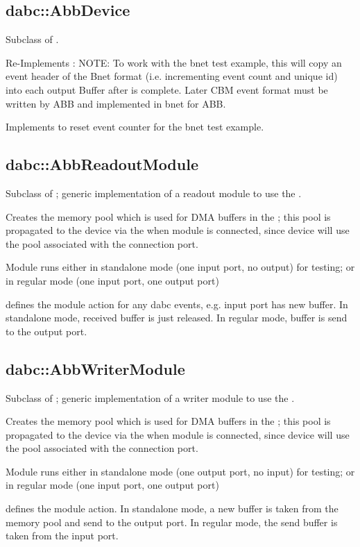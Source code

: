 \subsection{dabc::AbbDevice}
Subclass of .
\bcir
\item Re-Implements : NOTE: To work with the bnet test example, this will copy an event header of the Bnet format (i.e. incrementing event count and unique id) into each output Buffer after  is complete. Later CBM event format must be written by ABB and implemented in bnet for ABB.
\item Implements  to reset event counter for the bnet test example.
\ecir
\subsection{dabc::AbbReadoutModule}
Subclass of ; generic implementation of a readout module to use the .
\bcir
\item Creates the memory pool which is used for DMA buffers in the ; this pool is propagated to the device via the  when module is connected, since device will use the pool associated with the connection port.
\item Module runs either in standalone mode (one input port, no output) for testing; or in regular mode (one input port, one output port)
\item {} defines the module action for any dabc events, e.g. input port has new buffer. In standalone mode, received buffer is just released. In regular mode, buffer is send to the output port.
\ecir
\subsection{dabc::AbbWriterModule}
Subclass of ; generic implementation of a writer module to use the .
\bcir
\item Creates the memory pool which is used for DMA buffers in the ; this pool is propagated to the device via the  when module is connected, since device will use the pool associated with the connection port.
\item Module runs either in standalone mode (one output port, no input) for testing; or in regular mode (one input port, one output port)
\item {} defines the module action. In standalone mode, a new buffer is taken from the memory pool and send to the output port. In regular mode, the send buffer is taken from the input port.
\ecir
